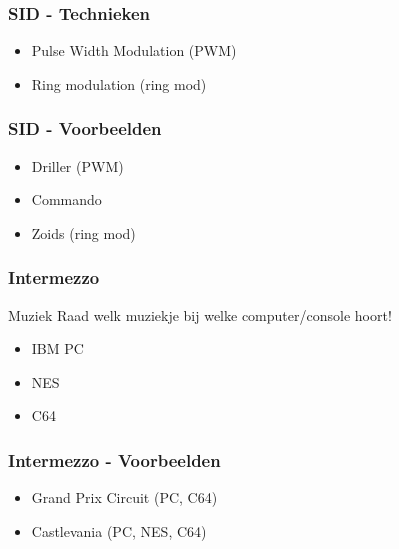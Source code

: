 
\begin{frame}
\frametitle{SID - Technieken}

\begin{itemize}
\item Pulse Width Modulation (PWM)
\item Ring modulation (ring mod)
\end{itemize}

\end{frame}


\begin{frame}
\frametitle{SID - Voorbeelden}

\begin{itemize}
\item Driller (PWM)
\item Commando
\item Zoids (ring mod)
\end{itemize}

\end{frame}


\begin{frame}
\frametitle{Intermezzo}

\begin{block}{Muziek}
Raad welk muziekje bij welke computer/console hoort!
\end{block}

\begin{itemize}
\item IBM PC
\item NES
\item C64
\end{itemize}

\end{frame}


\begin{frame}
\frametitle{Intermezzo - Voorbeelden}

\begin{itemize}
\item Grand Prix Circuit (PC, C64)
\item Castlevania (PC, NES, C64)
\end{itemize}

\end{frame}

